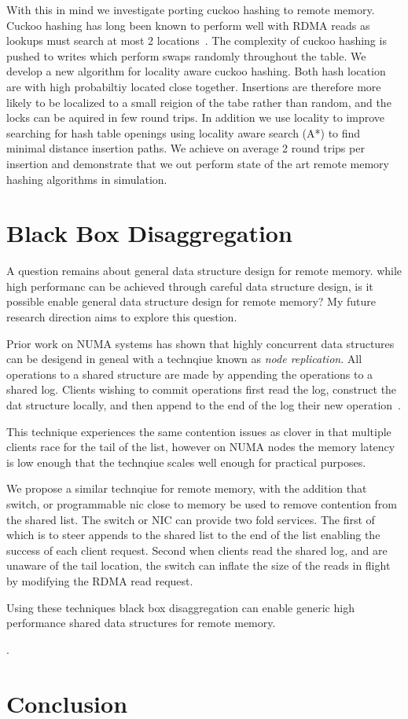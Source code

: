 With this in mind we investigate porting cuckoo hashing to
remote memory. Cuckoo hashing has long been known to perform
well with RDMA reads as lookups must search at most 2
locations~\cite{pilaf, farm}. The complexity of cuckoo
hashing is pushed to writes which perform swaps randomly
throughout the table. We develop a new algorithm for
locality aware cuckoo hashing. Both hash location are with
high probabiltiy located close together. Insertions are
therefore more likely to be localized to a small reigion of
the tabe rather than random, and the locks can be aquired in
few round trips. In addition we use locality to improve
searching for hash table openings using locality aware
search (A*) to find minimal distance insertion paths. We
achieve on average 2 round trips per insertion and
demonstrate that we out perform state of the art remote
memory hashing algorithms in simulation.



\section{Black Box Disaggregation}

A question remains about general data structure design for
remote memory. while high performanc can be achieved through
careful data structure design, is it possible enable general
data structure design for remote memory? My future research
direction aims to explore this question.

Prior work on NUMA systems has shown that highly concurrent
data structures can be desigend in geneal with a technqiue
known as \textit{node replication}. All operations to a
shared structure are made by appending the operations to a
shared log. Clients wishing to commit operations first read
the log, construct the dat structure locally, and then
append to the end of the log their new operation~\cite{bbd}.

This technique experiences the same contention issues as
clover in that multiple clients race for the tail of the
list, however on NUMA nodes the memory latency is low enough
that the technqiue scales well enough for practical
purposes. 

We propose a similar technqiue for remote memory, with the
addition that switch, or programmable nic close to memory be
used to remove contention from the shared list. The switch
or NIC can provide two fold services. The first of which is
to steer appends to the shared list to the end of the list
enabling the success of each client request. Second when
clients read the shared log, and are unaware of the tail
location, the switch can inflate the size of the reads in
flight by modifying the RDMA read request. 

Using these techniques black box disaggregation can enable
generic high performance shared data structures for remote
memory.

.

\section{Conclusion}

